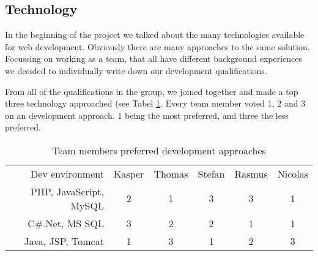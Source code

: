 \subsection{Technology}
In the beginning of the project we talked about the many technologies available for web development. Obviously there are many approaches to the same solution. Focussing on working as a team, that all have different background experiences we decided to individually write down our development qualifications.

From all of the qualifications in the group, we joined together and made a top three technology approached (see Tabel \ref{tbl:dev_environment}. Every team member voted 1, 2 and 3 on an development approach. 1 being the most preferred, and three the less preferred. 

\begin{table}[h]
\label{tbl:dev_environment}
\caption{Team members preferred development approaches}
    \begin{tabular}{rccccc}
    Dev environment        & Kasper & Thomas & Stefan & Rasmus & Nicolas \\
    PHP, JavaScript, MySQL & 2      & 1      & 3      & 3      & 1       \\
    C#.Net, MS SQL         & 3      & 2      & 2      & 1      & 1       \\
    Java, JSP, Tomcat      & 1      & 3      & 1      & 2      & 3       \\
    \end{tabular}
\end{table}